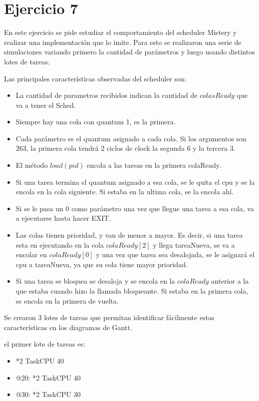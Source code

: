 \section{Ejercicio 7}

En este ejercicio se pide estudiar el comportamiento del scheduler Mistery y realizar una implementación que lo imite.
Para esto se realizaron una serie de simulaciones variando primero la cantidad de parámetros y luego usando distintos lotes de tareas.

Las principales características observadas del scheduler son:
\begin{itemize}
\item La cantidad de parametros recibidos indican la cantidad de $colasReady$ que va a tener el Sched.
\item Siempre hay una cola con quantum 1, es la primera.
\item Cada parámetro es el quantum asignado a cada cola. Si los argumentos son $2 6 3$, la primera cola tendrá 2 ciclos de clock
la segunda 6 y la tercera 3.
\item El método $load(pid)$ encola a las tareas en la primera colaReady. 
\item Si una tarea termina el quantum asignado a esa cola, se le quita el cpu y se la encola en la cola siguiente. Si estaba en la ultima cola, se la encola ahí.
\item Si se le pasa un 0 como parámetro una vez que llegue una tarea a esa cola, va a ejecutarse hasta hacer EXIT.
\item Las colas tienen prioridad, y van de menor a mayor. Es decir, si una tarea esta en ejecutando en la cola $colaReady[2]$ y llega tareaNueva, se va a encolar
en $colaReady[0]$ y una vez que tarea sea desalojada, se le asignará el cpu a tareaNueva, ya que su cola tiene mayor prioridad.
\item Si una tarea se bloquea se desaloja y se encola en la $colaReady$ anterior a la que estaba cuando hizo la llamada bloqueante. Si estaba en la primera cola,
se encola en la primera de vuelta.
\end{itemize}


Se crearon 3 lotes de tareas que permitan identificar fácilmente estas características en los diagramas de Gantt.

el primer lote de tareas es:

\begin{itemize}

\item *2 TaskCPU 40
\item @20:
 *2 TaskCPU 40
\item @30:
*2 TaskCPU 30

\end{itemize}

